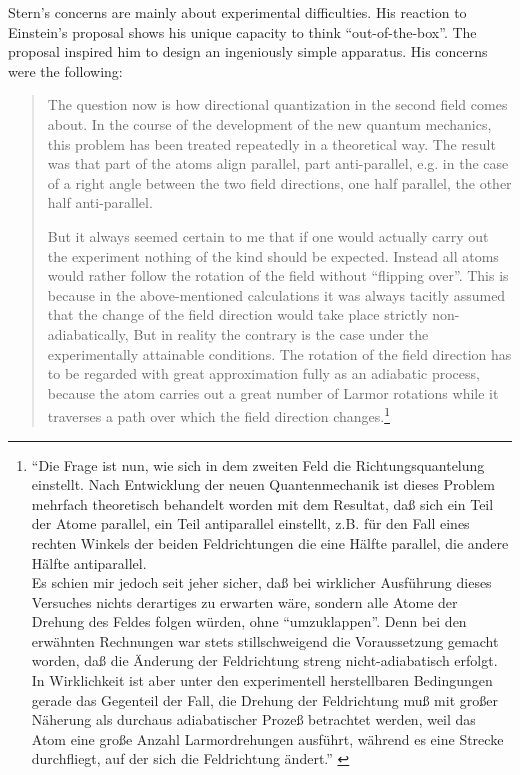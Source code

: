 \documentclass{article}
\begin{document}
Stern's concerns are mainly about experimental difficulties. His reaction to Einstein's proposal shows his unique capacity to think  ``out-of-the-box''. The proposal inspired him to design an ingeniously simple apparatus.  His concerns were the following:
\begin{quote}
The question now is how directional quantization in the second field comes about. In the course of the development of the new quantum mechanics, this problem has been treated repeatedly in a theoretical way. The result was that part of the atoms align parallel, part anti-parallel, e.g. in the case of a right angle between the two field directions, one half parallel, the other half anti-parallel.

But it always seemed certain to me that if one would actually carry out the experiment nothing of the kind should be expected. Instead all atoms would rather follow the rotation of the field without “flipping over”. This is because in the above-mentioned calculations it was always tacitly assumed that the change of the field direction would take place strictly non-adiabatically, But in reality the contrary is the case under the experimentally attainable conditions. The rotation of the field direction has to be regarded with great approximation fully as an adiabatic process, because the atom carries out a great number of Larmor rotations while it traverses a path over which the field direction changes.\footnote{``Die Frage ist nun, wie sich in dem zweiten Feld die Richtungsquantelung einstellt. Nach Entwicklung der neuen Quantenmechanik ist dieses Problem mehrfach theoretisch behandelt worden mit dem Resultat, daß sich ein Teil der Atome parallel, ein Teil antiparallel einstellt, z.B. für den Fall eines rechten Winkels der beiden Feldrichtungen die eine Hälfte parallel, die andere Hälfte antiparallel.\\
Es schien mir jedoch seit jeher sicher, daß bei wirklicher Ausführung dieses Versuches nichts derartiges zu erwarten wäre, sondern alle Atome der Drehung des Feldes folgen würden, ohne ``umzuklappen''. Denn bei den erwähnten Rechnungen war stets stillschweigend die Voraussetzung gemacht worden, daß die Änderung der Feldrichtung streng nicht-adiabatisch erfolgt. In Wirklichkeit ist aber unter den experimentell herstellbaren Bedingungen gerade das Gegenteil der Fall, die Drehung der Feldrichtung muß mit großer Näherung als durchaus adiabatischer Prozeß betrachtet werden, weil das Atom eine große Anzahl Larmordrehungen ausführt, während es eine Strecke durchfliegt, auf der sich die Feldrichtung ändert.'' \cite[pp.~185--186]{PhippsTEtal1932Einstellung}}
\end{quote}
\end{document}
